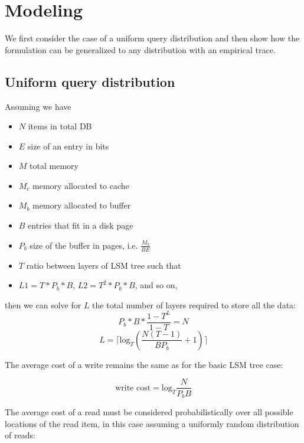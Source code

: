 \documentclass{cidr-2019}
\begin{document}
\clearpage

\section{Modeling} \label{modeling}

We first consider the case of a uniform query distribution and then show how
the formulation can be generalized to any distribution with an empirical trace.

\subsection{Uniform query distribution}

\noindent Assuming we have
\begin{itemize}
\itemsep-1em
\item $N$ items in total DB \\
\item $E$ size of an entry in bits \\
\item $M$ total memory \\
\item $M_c$ memory allocated to cache \\
\item $M_b$ memory allocated to buffer\\
\item $B$ entries that fit in a disk page \\
\item $P_b$ size of the buffer in pages, i.e. $\frac{M_b}{BE}$ \\
\item $T$ ratio between layers of LSM tree such that \\
\item $L1 = T * P_b * B$, $L2 =T^2 * P_b*B $, and so on,
\end{itemize}

\noindent then we can solve for $L$ the total number of layers required to store all the data: \\
$$P_b*B * \frac{1-T^L}{1-T} = N$$
$$L= \lceil \textrm{log}_{T} \left(\frac{N(T-1)}{BP_b} + 1\right) \rceil$$


The average cost of a write remains the same as for the basic LSM tree case:

$$
\text{write cost} = \textrm{log}_{T} \frac{N}{P_bB}
$$

The average cost of a read must be considered probabilistically over all
possible locations of the read item, in this case assuming a uniformly random
distribution of reads:
\end{document}
